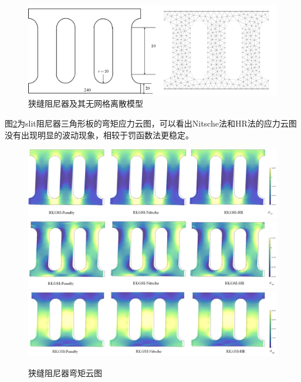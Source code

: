 \begin{figure}[H]
    \centering
    \includegraphics[scale=0.45]{figure/DAMPER/SLIT/slit damper_msh.png}
    \caption{狭缝阻尼器及其无网格离散模型}\label{slitmsh}
\end{figure}
图\ref{slitM}为slit阻尼器三角形板的弯矩应力云图，可以看出Nitsche法和HR法的应力云图没有出现明显的波动现象，相较于罚函数法更稳定。
\begin{figure}[H]
    \centering
        \includegraphics[scale=0.5]{figure/DAMPER/slit/M11.png}
        \includegraphics[scale=0.5]{figure/DAMPER/slit/M12.png}
        \includegraphics[scale=0.5]{figure/DAMPER/slit/M22.png}
    \caption{狭缝阻尼器弯矩云图}\label{slitM}
\end{figure}
